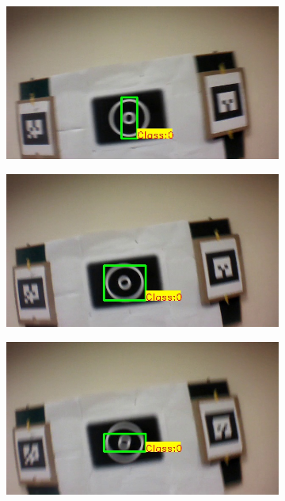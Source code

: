 \documentclass[runningheads]{llncs}
\begin{document}
\begin{figure}
\begin{subfigure}[b]{.19\textwidth}
\end{subfigure}\\
\begin{subfigure}[b]{.19\textwidth}
\includegraphics[width=\linewidth]{BLUT_input_00/output2.jpg}
\end{subfigure}
\begin{subfigure}[b]{.19\textwidth}
\includegraphics[width=\linewidth]{BLUT_input_00/output3.jpg}
\end{subfigure}
\begin{subfigure}[b]{.19\textwidth}
\includegraphics[width=\linewidth]{BLUT_input_00/output4.jpg}

\end{subfigure}
\end{figure}
\end{document}
